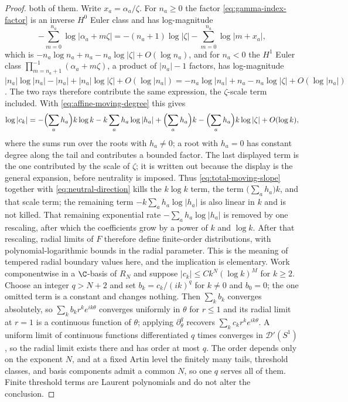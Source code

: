\begin{proof}
both of them.  Write \(x_a=\alpha_a/\zeta\).  For \(n_a\geq0\) the factor
\eqref{eq:gamma-index-factor} is an inverse \(H^0\) Euler class and has
log-magnitude
\[
 -\sum_{m=0}^{n_a}\log|\alpha_a+m\zeta|
 =-(n_a+1)\log|\zeta|-\sum_{m=0}^{n_a}\log|m+x_a|,
\]
which is \(-n_a\log n_a+n_a-n_a\log|\zeta|+O(\log n_a)\),
and for \(n_a<0\) the
\(H^1\) Euler class \(\prod_{m=n_a+1}^{-1}(\alpha_a+m\zeta)\), a product of
\(|n_a|-1\) factors, has
log-magnitude \(|n_a|\log|n_a|-|n_a|+|n_a|\log|\zeta|+O(\log|n_a|)
=-n_a\log|n_a|+n_a-n_a\log|\zeta|+O(\log|n_a|)\).  The two rays therefore
contribute the same expression, the \(\zeta\)-scale term included.  With
\eqref{eq:affine-moving-degree} this gives
\[
 \log|c_k|=
 -\Bigl(\sum_ah_a\Bigr)k\log k
 -k\sum_ah_a\log|h_a|
 +\Bigl(\sum_ah_a\Bigr)k
 -\Bigl(\sum_ah_a\Bigr)k\log|\zeta|
 +O(\log k),
\]
where the sums run over the roots with \(h_a\neq0\); a root with \(h_a=0\) has
constant degree along the tail and contributes a bounded factor.  The last
displayed term is the one contributed by the scale of \(\zeta\); it is written
out because the display is the general expansion, before neutrality is
imposed.  Thus
\eqref{eq:total-moving-slope} together with \eqref{eq:neutral-direction}
kills the \(k\log k\) term, the term \(\bigl(\sum_ah_a\bigr)k\), and that
scale term; the remaining term \(-k\sum_ah_a\log|h_a|\) is also linear in
\(k\) and is not killed.  That remaining
exponential rate \(-\sum_ah_a\log|h_a|\) is removed by one rescaling, after
which the coefficients grow by a power of \(k\) and
\(\log k\).  After that rescaling, radial limits of \(F\) therefore define
finite-order distributions, with polynomial-logarithmic bounds in the radial
parameter.  This is the meaning of tempered radial boundary values here, and
the implication is elementary.  Work componentwise in a \(\C\)-basis of
\(R_N\) and suppose \(|c_k|\leq Ck^N(\log k)^M\) for \(k\geq2\).  Choose an
integer \(q>N+2\) and set \(b_k=c_k/(ik)^q\) for \(k\neq0\) and \(b_0=0\); the
one omitted term is a constant and changes nothing.  Then
\(\sum_kb_k\) converges absolutely, so \(\sum_kb_kr^ke^{ik\theta}\) converges
uniformly in \(\theta\) for \(r\leq1\) and its radial limit at \(r=1\) is a
continuous function of \(\theta\); applying \(\partial_\theta^q\) recovers
\(\sum_kc_kr^ke^{ik\theta}\).  A uniform limit of continuous functions
differentiated \(q\) times converges in \(\mathcal D'(S^1)\), so the radial
limit exists there and has order at most \(q\).  The order depends only on the
exponent \(N\), and at a fixed Artin level the finitely many tails, threshold
classes, and basis components admit a common \(N\), so one \(q\) serves all of
them.
Finite threshold terms are Laurent polynomials and do not alter the
conclusion.
\end{proof}

